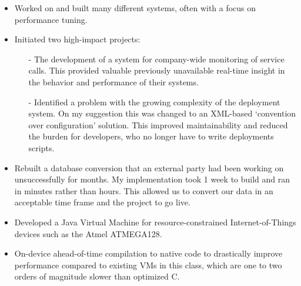 \documentclass[10pt,a4paper]{../altacv}
\begin{document}
\medskip

\begin{itemize}
	\item\small{Worked on and built many different systems, often with a focus on performance tuning.}
	\item\small{Initiated two high-impact projects:
	\begin{itemize}
		\item[-]\small{The development of a system for company-wide monitoring of service calls. This provided valuable previously unavailable real-time insight in the behavior and performance of their systems.}
		\item[-]\small{Identified a problem with the growing complexity of the deployment system. On my suggestion this was changed to an XML-based ‘convention over configuration' solution. This improved maintainability and reduced the burden for developers, who no longer have to write deployments scripts.}
	\end{itemize}
	}
	\item\small{Rebuilt a database conversion that an external party had been working on unsuccessfully for months. My implementation took 1 week to build and ran in minutes rather than hours. This allowed us to convert our data in an acceptable time frame and the project to go live.}
\end{itemize}

\medskip
\medskip

\begin{comment}
\cvevent{Postdoctoral Researcher}{Academia Sinica}{Mar 2020 -- May 2021}{Taipei, Taiwan}
Research on disinformation.
\cvtag{Golang}
\cvtag{HTML}
\cvtag{CSS}
\cvevent{Postdoctoral Researcher}{National Taiwan University}{Feb 2019 -- Aug 2019}{Taipei, Taiwan}
Blockchain

\medskip
\medskip
\end{comment}

\medskip\medskip{}

\begin{itemize}
	\item\small{Developed a Java Virtual Machine for resource-constrained Internet-of-Things devices such as the Atmel ATMEGA128.}
	\item\small{On-device ahead-of-time compilation to native code to drastically improve performance compared to existing VMs in this class, which are one to two orders of magnitude slower than optimized C.}
\end{itemize}
\end{document}
